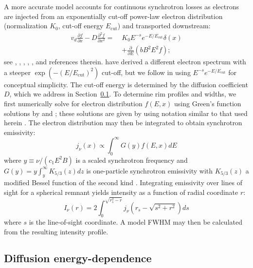 \documentclass[iop, apj, numberedappendix, twocolappendix]{emulateapj}
\newcommand*{\mt}{\mathrm}
\newcommand*{\ptl}{\partial}
\newcommand*{\Ecut}{E_{\mt{cut}}}
\begin{document}
A more accurate model accounts for continuous synchrotron losses as electrons
are injected from an exponentially cut-off power-law electron distribution
(normalization $K_0$, cut-off energy $\Ecut$) and transported downstream:
\begin{align} \label{eq:full-mod}
    v_d \frac{\ptl f}{\ptl x} - D \frac{\ptl^2 f}{\ptl x^2} =\;
    &K_0 E^{-s} e^{-E/\Ecut} \delta(x) \nonumber \\
    &+ \frac{\ptl}{\ptl E} \left(bB^2E^2f\right) ;
\end{align}
see \citet{webb1984}, \citet{berezhko2004}, \citet{cassam-chenai2007},
\citet{morlino2010}, \citet{rettig2012}, and references therein.
\citet{zirakashvili2007} have derived a different electron spectrum with a
steeper $\exp\left(- \left(E/\Ecut\right)^2\right)$ cut-off, but we follow
 in using $E^{-s} e^{-E/\Ecut}$ for conceptual
simplicity.  The cut-off energy is determined by the diffusion coefficient $D$,
which we address in Section~\ref{sec:diffcoeff}.  To determine rim profiles and
widths, we first numerically solve for electron distribution $f(E,x)$ using
Green's function solutions by \citet{lerche1980} and \citet{rettig2012}; these
solutions are given by  using notation similar to that
used herein .  The electron distribution may then be
integrated to obtain synchrotron emissivity:
\begin{equation} \label{eq:emissivity}
    j_{\nu}(x) \propto \int_0^\infty G(y) f(E,x) dE
\end{equation}
where $y \equiv \nu/(c_1 E^2 B)$ is a scaled synchrotron frequency and
$G(y) = y \int_y^\infty K_{5/3}(z) dz$ is one-particle synchrotron emissivity
with $K_{5/3}(z)$ a modified Bessel function of the second kind
\citep{pacholczyk1970}.  Integrating emissivity over lines of sight for a
spherical remnant yields intensity as a function of radial coordinate $r$:
\begin{equation} \label{eq:intensity}
    I_{\nu}(r) = 2 \int_0^{\sqrt{r_s^2 - r}}
                    j_{\nu} \left( r_s - \sqrt{s^2 + r^2} \right) ds
\end{equation}
where $s$ is the line-of-sight coordinate.  A model FWHM may then be calculated
from the resulting intensity profile.

\subsection{Diffusion energy-dependence} \label{sec:diffcoeff}
\end{document}
